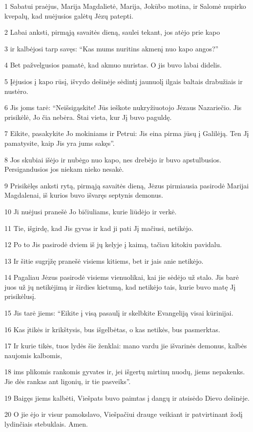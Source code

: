 \par 1 Sabatui praėjus, Marija Magdalietė, Marija, Jokūbo motina, ir Salomė nupirko kvepalų, kad nuėjusios galėtų Jėzų patepti. 
\par 2 Labai anksti, pirmąją savaitės dieną, saulei tekant, jos atėjo prie kapo 
\par 3 ir kalbėjosi tarp savęs: “Kas mums nuritins akmenį nuo kapo angos?” 
\par 4 Bet pažvelgusios pamatė, kad akmuo nuristas. O jis buvo labai didelis. 
\par 5 Įėjusios į kapo rūsį, išvydo dešinėje sėdintį jaunuolį ilgais baltais drabužiais ir nustėro. 
\par 6 Jis joms tarė: “Neišsigąskite! Jūs ieškote nukryžiuotojo Jėzaus Nazariečio. Jis prisikėlė, Jo čia nebėra. Štai vieta, kur Jį buvo paguldę. 
\par 7 Eikite, pasakykite Jo mokiniams ir Petrui: Jis eina pirma jūsų į Galilėją. Ten Jį pamatysite, kaip Jis yra jums sakęs”. 
\par 8 Jos skubiai išėjo ir nubėgo nuo kapo, nes drebėjo ir buvo apstulbusios. Persigandusios jos niekam nieko nesakė. 
\par 9 Prisikėlęs anksti rytą, pirmąją savaitės dieną, Jėzus pirmiausia pasirodė Marijai Magdalenai, iš kurios buvo išvaręs septynis demonus. 
\par 10 Ji nuėjusi pranešė Jo bičiuliams, kurie liūdėjo ir verkė. 
\par 11 Tie, išgirdę, kad Jis gyvas ir kad ji pati Jį mačiusi, netikėjo. 
\par 12 Po to Jis pasirodė dviem iš jų kelyje į kaimą, tačiau kitokiu pavidalu. 
\par 13 Ir šitie sugrįžę pranešė visiems kitiems, bet ir jais anie netikėjo. 
\par 14 Pagaliau Jėzus pasirodė visiems vienuolikai, kai jie sėdėjo už stalo. Jis barė juos už jų netikėjimą ir širdies kietumą, kad netikėjo tais, kurie buvo matę Jį prisikėlusį. 
\par 15 Jis tarė jiems: “Eikite į visą pasaulį ir skelbkite Evangeliją visai kūrinijai. 
\par 16 Kas įtikės ir krikštysis, bus išgelbėtas, o kas netikės, bus pasmerktas. 
\par 17 Ir kurie tikės, tuos lydės šie ženklai: mano vardu jie išvarinės demonus, kalbės naujomis kalbomis, 
\par 18 ims plikomis rankomis gyvates ir, jei išgertų mirtinų nuodų, jiems nepakenks. Jie dės rankas ant ligonių, ir tie pasveiks”. 
\par 19 Baigęs jiems kalbėti, Viešpats buvo paimtas į dangų ir atsisėdo Dievo dešinėje. 
\par 20 O jie ėjo ir visur pamokslavo, Viešpačiui drauge veikiant ir patvirtinant žodį lydinčiais stebuklais. Amen.



